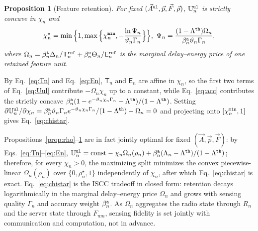 \documentclass[journal]{IEEEtran}
\newtheorem{proposition}{Proposition}
\begin{document}
\begin{proposition}[Feature retention]\label{prop:chi}
For fixed $(\vec{A}^{\tt ul},\vec{p},\vec{F},\vec{\rho})$, $\mathbb{U}_n^{\tt ul}$ is strictly concave in $\chi_n$ and
\begin{equation}
\chi_n^\star
=\min\Big\{1,\max\Big\{\chi_n^{\tt min},-\frac{\ln\Psi_n}{\vartheta_n \Gamma_n}\Big\}\Big\},
\ 
\Psi_n=\frac{(1-\Lambda^{\tt th})\Omega_n}{\beta_n^{\tt a}\vartheta_n \Gamma_n},
\label{eq:chistar}
\end{equation}
where $\Omega_n=\beta_n^{\tt t}\Delta_n/\mathsf{T}_n^{\tt ref}+\beta_n^{\tt e}\Theta_n/\mathsf{E}_n^{\tt ref}$ is the marginal delay--energy price of one retained feature unit.
\end{proposition}
\begin{IEEEproof}
By Eq.~\eqref{eq:Tn} and Eq.~\eqref{eq:En}, $\mathsf{T}_n$ and $\mathsf{E}_n$ are affine in $\chi_n$, so the first two terms of Eq.~\eqref{eq:Uul} contribute $-\Omega_n\chi_n$ up to a constant, while Eq.~\eqref{eq:acc} contributes the strictly concave $\beta_n^{\tt a}(1-e^{-\vartheta_n\chi_n \Gamma_n}-\Lambda^{\tt th})/(1-\Lambda^{\tt th})$. Setting $\partial\mathbb{U}_n^{\tt ul}/\partial\chi_n=\beta_n^{\tt a}\vartheta_n \Gamma_n e^{-\vartheta_n\chi_n \Gamma_n}/(1-\Lambda^{\tt th})-\Omega_n=0$ and projecting onto $[\chi_n^{\tt min},1]$ gives Eq.~\eqref{eq:chistar}.
\end{IEEEproof}
Propositions~\ref{prop:rho}--\ref{prop:chi} are in fact jointly optimal for fixed $(\vec{A},\vec{p},\vec{F})$: by Eqs.~\eqref{eq:Tn}--\eqref{eq:En}, $\mathbb{U}_n^{\tt ul}=\mathrm{const}-\chi_n\Omega_n(\rho_n)+\beta_n^{\tt a}(\Lambda_n-\Lambda^{\tt th})/(1-\Lambda^{\tt th})$; therefore, for every $\chi_n>0$, the maximizing split minimizes the convex piecewise-linear $\Omega_n(\rho_n)$ over $\{0,\rho_n^\star,1\}$ independently of $\chi_n$, after which Eq.~\eqref{eq:chistar} is exact. Eq.~\eqref{eq:chistar} is the ISCC tradeoff in closed form: retention decays logarithmically in the marginal delay--energy price $\Omega_n$ and grows with sensing quality $\Gamma_n$ and accuracy weight $\beta_n^{\tt a}$. As $\Omega_n$ aggregates the radio state through $R_n$ and the server state through $F_{nm}$, sensing fidelity is set jointly with communication and computation, not in advance.
\end{document}
